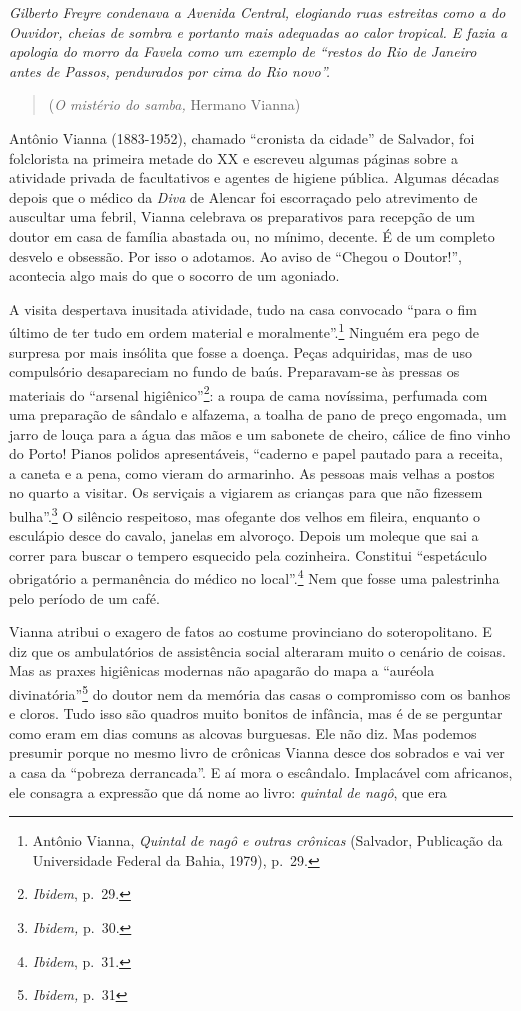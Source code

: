 \emph{Gilberto Freyre condenava a Avenida Central, elogiando ruas
estreitas como a do Ouvidor, cheias de sombra e portanto mais adequadas
ao calor tropical. E fazia a apologia do morro da Favela como um exemplo
de ``restos do Rio de Janeiro antes de Passos, pendurados por cima do
Rio novo''.}

\begin{quote}
(\emph{O mistério do samba,} Hermano Vianna)
\end{quote}

Antônio Vianna (1883-1952), chamado ``cronista da cidade'' de Salvador,
foi folclorista na primeira metade do XX e escreveu algumas páginas
sobre a atividade privada de facultativos e agentes de higiene pública.
Algumas décadas depois que o médico da \emph{Diva} de Alencar foi
escorraçado pelo atrevimento de auscultar uma febril, Vianna celebrava
os preparativos para recepção de um doutor em casa de família abastada
ou, no mínimo, decente. É de um completo desvelo e obsessão. Por isso o
adotamos. Ao aviso de ``Chegou o Doutor!'', acontecia algo mais do que o
socorro de um agoniado.

A visita despertava inusitada atividade, tudo na casa convocado ``para o
fim último de ter tudo em ordem material e moralmente''.\footnote{Antônio
  Vianna, \emph{Quintal de nagô e outras crônicas} (Salvador, Publicação
  da Universidade Federal da Bahia, 1979), p.~29.} Ninguém era pego de
surpresa por mais insólita que fosse a doença. Peças adquiridas, mas de
uso compulsório desapareciam no fundo de baús. Preparavam-se às pressas
os materiais do ``arsenal higiênico''\footnote{\emph{Ibidem}, p.~29.}: a
roupa de cama novíssima, perfumada com uma preparação de sândalo e
alfazema, a toalha de pano de preço engomada, um jarro de louça para a
água das mãos e um sabonete de cheiro, cálice de fino vinho do Porto!
Pianos polidos apresentáveis, ``caderno e papel pautado para a receita,
a caneta e a pena, como vieram do armarinho. As pessoas mais velhas a
postos no quarto a visitar. Os serviçais a vigiarem as crianças para que
não fizessem bulha''.\footnote{\emph{Ibidem,} p.~30.} O silêncio
respeitoso, mas ofegante dos velhos em fileira, enquanto o esculápio
desce do cavalo, janelas em alvoroço. Depois um moleque que sai a correr
para buscar o tempero esquecido pela cozinheira. Constitui ``espetáculo
obrigatório a permanência do médico no local''.\footnote{\emph{Ibidem},
  p.~31.} Nem que fosse uma palestrinha pelo período de um café.

Vianna atribui o exagero de fatos ao costume provinciano do
soteropolitano. E diz que os ambulatórios de assistência social
alteraram muito o cenário de coisas. Mas as praxes higiênicas modernas
não apagarão do mapa a ``auréola divinatória''\footnote{\emph{Ibidem,}
  p.~31} do doutor nem da memória das casas o compromisso com os banhos
e cloros. Tudo isso são quadros muito bonitos de infância, mas é de se
perguntar como eram em dias comuns as alcovas burguesas. Ele não diz.
Mas podemos presumir porque no mesmo livro de crônicas Vianna desce dos
sobrados e vai ver a casa da ``pobreza derrancada''. E aí mora o
escândalo. Implacável com africanos, ele consagra a expressão que dá
nome ao livro: \emph{quintal de nagô}, que era

